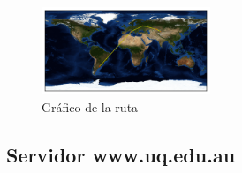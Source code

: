 \begin{figure}[H]
  \centering
    \includegraphics[width=0.45\textwidth]{grafico-rutas/www-kstu-kz.png}
  \caption{Gráfico de la ruta}
  \label{entropia-s}
\end{figure}




\subsection{Servidor www.uq.edu.au}
